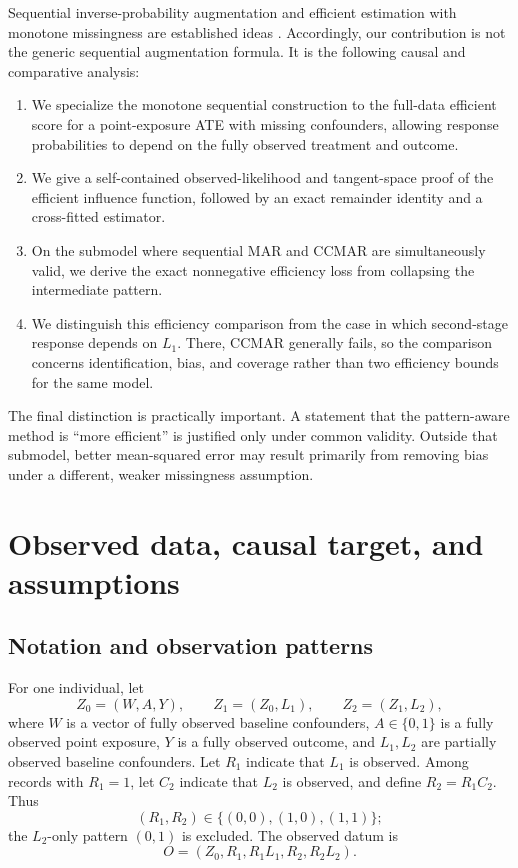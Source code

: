 \documentclass[11pt]{article}
\theoremstyle{definition}
\newcommand{\1}{\mathbf{1}}
\begin{document}
Sequential inverse-probability augmentation and efficient estimation with monotone missingness are established ideas \citep{rrz1994,gill1997,tsiatis2006,barnwell2025}. Accordingly, our contribution is not the generic sequential augmentation formula. It is the following causal and comparative analysis:
\begin{enumerate}[leftmargin=*,itemsep=3pt]
\item We specialize the monotone sequential construction to the full-data efficient score for a point-exposure ATE with missing confounders, allowing response probabilities to depend on the fully observed treatment and outcome.
\item We give a self-contained observed-likelihood and tangent-space proof of the efficient influence function, followed by an exact remainder identity and a cross-fitted estimator.
\item On the submodel where sequential MAR and CCMAR are simultaneously valid, we derive the exact nonnegative efficiency loss from collapsing the intermediate pattern.
\item We distinguish this efficiency comparison from the case in which second-stage response depends on $L_1$. There, CCMAR generally fails, so the comparison concerns identification, bias, and coverage rather than two efficiency bounds for the same model.
\end{enumerate}

The final distinction is practically important. A statement that the pattern-aware method is ``more efficient'' is justified only under common validity. Outside that submodel, better mean-squared error may result primarily from removing bias under a different, weaker missingness assumption.

\section{Observed data, causal target, and assumptions}

\subsection{Notation and observation patterns}

For one individual, let
\[
Z_0=(W,A,Y),\qquad Z_1=(Z_0,L_1),\qquad Z_2=(Z_1,L_2),
\]
where $W$ is a vector of fully observed baseline confounders, $A\in\{0,1\}$ is a fully observed point exposure, $Y$ is a fully observed outcome, and $L_1,L_2$ are partially observed baseline confounders. Let $R_1$ indicate that $L_1$ is observed. Among records with $R_1=1$, let $C_2$ indicate that $L_2$ is observed, and define $R_2=R_1C_2$. Thus
\[
(R_1,R_2)\in\{(0,0),(1,0),(1,1)\};
\]
the $L_2$-only pattern $(0,1)$ is excluded. The observed datum is
\[
O=(Z_0,R_1,R_1L_1,R_2,R_2L_2).
\]
\end{document}
